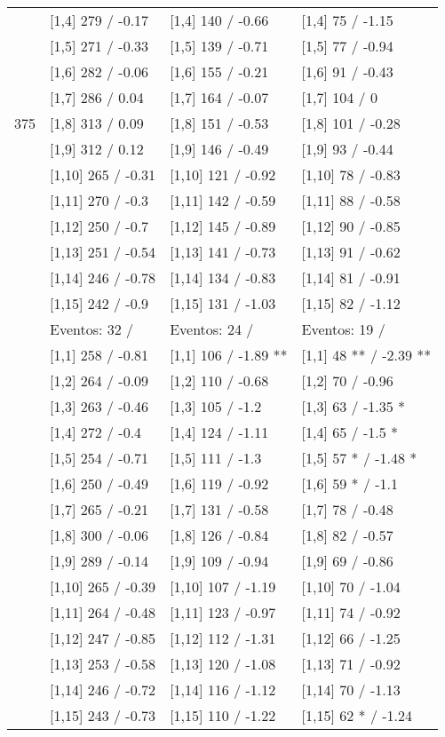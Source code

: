 \begin{table}
\begin{tabular}[t]{llll}
\addlinespace
 & {}[1,4] 279  / -0.17 & {}[1,4] 140  / -0.66 & {}[1,4] 75  / -1.15\\
 & {}[1,5] 271  / -0.33 & {}[1,5] 139  / -0.71 & {}[1,5] 77  / -0.94\\
 & {}[1,6] 282  / -0.06 & {}[1,6] 155  / -0.21 & {}[1,6] 91  / -0.43\\
 & {}[1,7] 286  / 0.04 & {}[1,7] 164  / -0.07 & {}[1,7] 104  / 0\\
375 & {}[1,8] 313  / 0.09 & {}[1,8] 151  / -0.53 & {}[1,8] 101  / -0.28\\
\addlinespace
 & {}[1,9] 312  / 0.12 & {}[1,9] 146  / -0.49 & {}[1,9] 93  / -0.44\\
 & {}[1,10] 265  / -0.31 & {}[1,10] 121  / -0.92 & {}[1,10] 78  / -0.83\\
 & {}[1,11] 270  / -0.3 & {}[1,11] 142  / -0.59 & {}[1,11] 88  / -0.58\\
 & {}[1,12] 250  / -0.7 & {}[1,12] 145  / -0.89 & {}[1,12] 90  / -0.85\\
 & {}[1,13] 251  / -0.54 & {}[1,13] 141  / -0.73 & {}[1,13] 91  / -0.62\\
\addlinespace
 & {}[1,14] 246  / -0.78 & {}[1,14] 134  / -0.83 & {}[1,14] 81  / -0.91\\
 & {}[1,15] 242  / -0.9 & {}[1,15] 131  / -1.03 & {}[1,15] 82  / -1.12\\
 & Eventos:  32 / & Eventos:  24 / & Eventos:  19 /\\
 & {}[1,1] 258  / -0.81 & {}[1,1] 106  / -1.89 ** & {}[1,1] 48 ** / -2.39 **\\
 & {}[1,2] 264  / -0.09 & {}[1,2] 110  / -0.68 & {}[1,2] 70  / -0.96\\
\addlinespace
 & {}[1,3] 263  / -0.46 & {}[1,3] 105  / -1.2 & {}[1,3] 63  / -1.35 *\\
 & {}[1,4] 272  / -0.4 & {}[1,4] 124  / -1.11 & {}[1,4] 65  / -1.5 *\\
 & {}[1,5] 254  / -0.71 & {}[1,5] 111  / -1.3 & {}[1,5] 57 * / -1.48 *\\
 & {}[1,6] 250  / -0.49 & {}[1,6] 119  / -0.92 & {}[1,6] 59 * / -1.1\\
 & {}[1,7] 265  / -0.21 & {}[1,7] 131  / -0.58 & {}[1,7] 78  / -0.48\\
\addlinespace
500 & {}[1,8] 300  / -0.06 & {}[1,8] 126  / -0.84 & {}[1,8] 82  / -0.57\\
 & {}[1,9] 289  / -0.14 & {}[1,9] 109  / -0.94 & {}[1,9] 69  / -0.86\\
 & {}[1,10] 265  / -0.39 & {}[1,10] 107  / -1.19 & {}[1,10] 70  / -1.04\\
 & {}[1,11] 264  / -0.48 & {}[1,11] 123  / -0.97 & {}[1,11] 74  / -0.92\\
 & {}[1,12] 247  / -0.85 & {}[1,12] 112  / -1.31 & {}[1,12] 66  / -1.25\\
\addlinespace
 & {}[1,13] 253  / -0.58 & {}[1,13] 120  / -1.08 & {}[1,13] 71  / -0.92\\
 & {}[1,14] 246  / -0.72 & {}[1,14] 116  / -1.12 & {}[1,14] 70  / -1.13\\
 & {}[1,15] 243  / -0.73 & {}[1,15] 110  / -1.22 & {}[1,15] 62 * / -1.24\\
\bottomrule
\end{tabular}
\end{table}
